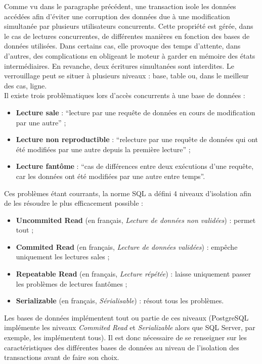 	Comme vu dans le paragraphe précédent, une transaction isole les données accédées afin d'éviter une corruption des données due à une modification simultanée par plusieurs utilisateurs concurrents. Cette propriété est gérée, dans le cas de lectures concurrentes, de différentes manières en fonction des bases de données utilisées. Dans certains cas, elle provoque des temps d'attente, dans d'autres, des complications en obligeant le moteur à garder en mémoire des états intermédiaires. En revanche, deux écritures simultanées sont interdites. Le verrouillage peut se situer à plusieurs niveaux : base, table ou, dans le meilleur des cas, ligne.\\

	Il existe trois problèmatiques lors d'accès concurrents à une base de données :
	\vspace{10px}
	\begin{itemize}
		\item \textbf{Lecture sale} : \enquote{lecture par une requête de données en cours de modification par une autre}\cite{wiktionnaireLectureSale} ;
		\item \textbf{Lecture non reproductible} : \enquote{relecture par une requête de données qui ont été modifiées par une autre depuis la première lecture}\cite{wiktionnaireLectureNonReproductible} ;
		\item \textbf{Lecture fantôme} : \enquote{cas de différences entre deux exécutions d'une requête, car les données ont été modifiées par une autre entre temps}\cite{wiktionnaireLectureFantome}.
	\end{itemize}
	\vspace{10px}

	 Ces problèmes étant courrants, la norme SQL a défini 4 niveaux d'isolation afin de les résoudre le plus efficacement possible :
	\vspace{10px}
	\begin{itemize}
		\item \textbf{Uncommited Read} (en français, \textit{Lecture de données non validées}) : permet tout ;
		\item \textbf{Commited Read} (en français, \textit{Lecture de données validées}) : empêche uniquement les lectures sales ;
		\item \textbf{Repeatable Read} (en français, \textit{Lecture répétée}) : laisse uniquement passer les problèmes de lectures fantômes ;
		\item \textbf{Serializable} (en français, \textit{Sérialisable}) : résout tous les problèmes.
	\end{itemize}
	\vspace{20px}
	 Les bases de données implémentent tout ou partie de ces niveaux (PostgreSQL implémente les niveaux \textit{Commited Read} et \textit{Serializable}\cite{isolationTransactionPostgre} alors que SQL Server, par exemple, les implémentent tous\cite{isolationTransactionSQLServer}). Il est donc nécessaire de se renseigner sur les caractéristiques des différentes bases de données au niveau de l'isolation des transactions avant de faire son choix.\\

